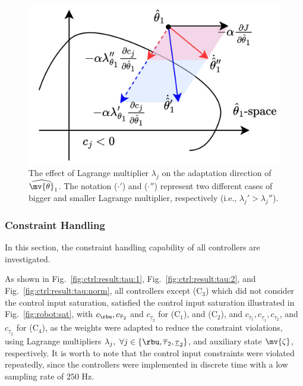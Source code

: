 \documentclass[lettersize,journal]{IEEEtran}
\begin{document}
\begin{figure}[!t]
	\centering
	\includegraphics[width=0.6\linewidth]{
		src/figures/lambda_effect.drawio.pdf
		}
	\caption{
		The effect of Lagrange multiplier $\lambda_{j}$ on the adaptation direction of $\widehat{ \mv{\theta}}_1$.
		The notation ($\cdot'$) and ($\cdot''$) represent two different cases of bigger and smaller Lagrange multiplier, respectively (i.e., $\lambda_{j}' > \lambda_{j}''$).
	}
	\label{fig:lambda_effect}
\end{figure}

\hfill
\subsubsection{Constraint Handling} \label{sec:sim:constraint}

In this section, the constraint handling capability of all controllers are investigated.

As shown in Fig.~\ref{fig:ctrl:result:tau:1}, Fig.~\ref{fig:ctrl:result:tau:2}, and Fig.~\ref{fig:ctrl:result:tau:norm}, all controllers except (C$_3$) which did not consider the control input saturation, satisfied the control input saturation illustrated in Fig.~\ref{fig:robot:sat}, with $c_{\rbu},c_{\overline\tau_2}$ and $c_{\underline\tau_2}$ for (C$_1$), and (C$_2$), and $c_{\overline\tau_1},c_{\underline\tau_1},c_{\overline\tau_2}$, and $c_{\underline\tau_2}$ for (C$_4$), as the weights were adapted to reduce the constraint violations, using Lagrange multipliers $\lambda_j,\ \forall j\in\{\rbu,\overline{\tau}_2,\underline{\tau}_2\}$, and auxiliary state $\mv{\zeta}$, respectively.
It is worth to note that the control input constraints were violated repeatedly, since the controllers were implemented in discrete time with a low sampling rate of $250$ Hz.
\end{document}
